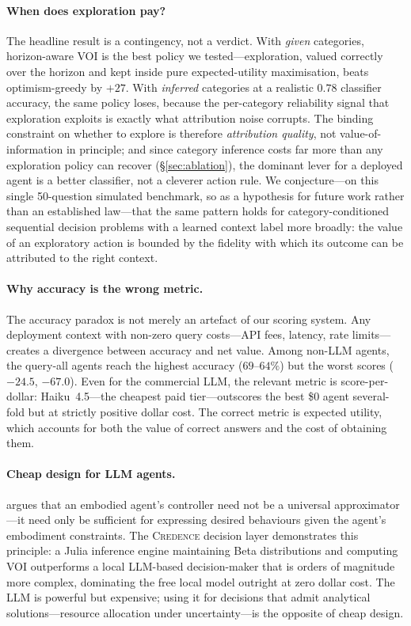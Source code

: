 \documentclass[11pt]{article}
\newcommand{\credence}{\textsc{Credence}}
\begin{document}
\paragraph{When does exploration pay?}
The headline result is a contingency, not a verdict. With \emph{given} categories, horizon-aware VOI is the best policy we tested---exploration, valued correctly over the horizon and kept inside pure expected-utility maximisation, beats optimism-greedy by $+27$. With \emph{inferred} categories at a realistic $0.78$ classifier accuracy, the same policy loses, because the per-category reliability signal that exploration exploits is exactly what attribution noise corrupts. The binding constraint on whether to explore is therefore \emph{attribution quality}, not value-of-information in principle; and since category inference costs far more than any exploration policy can recover (\S\ref{sec:ablation}), the dominant lever for a deployed agent is a better classifier, not a cleverer action rule. We conjecture---on this single 50-question simulated benchmark, so as a hypothesis for future work rather than an established law---that the same pattern holds for category-conditioned sequential decision problems with a learned context label more broadly: the value of an exploratory action is bounded by the fidelity with which its outcome can be attributed to the right context.

\paragraph{Why accuracy is the wrong metric.}
The accuracy paradox is not merely an artefact of our scoring system. Any deployment context with non-zero query costs---API fees, latency, rate limits---creates a divergence between accuracy and net value. Among non-LLM agents, the query-all agents reach the highest accuracy ($69$--$64\%$) but the worst scores ($-24.5$, $-67.0$). Even for the commercial LLM, the relevant metric is score-per-dollar: Haiku~4.5---the cheapest paid tier---outscores the best \$0 agent several-fold but at strictly positive dollar cost. The correct metric is expected utility, which accounts for both the value of correct answers and the cost of obtaining them.

\paragraph{Cheap design for LLM agents.}
\citet{ay2015geometric} argues that an embodied agent's controller need not be a universal approximator---it need only be sufficient for expressing desired behaviours given the agent's embodiment constraints. The \credence{} decision layer demonstrates this principle: a Julia inference engine maintaining Beta distributions and computing VOI outperforms a local LLM-based decision-maker that is orders of magnitude more complex, dominating the free local model outright at zero dollar cost. The LLM is powerful but expensive; using it for decisions that admit analytical solutions---resource allocation under uncertainty---is the opposite of cheap design.
\end{document}
